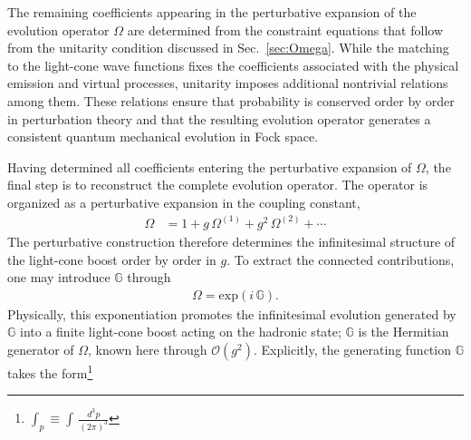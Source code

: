 \documentclass[a4paper,11pt]{article}
\def\mf#1{\mathbb{#1}}
\begin{document}
The remaining coefficients appearing in the perturbative expansion of the evolution operator $\Omega$ are determined from the constraint equations that follow from the unitarity condition discussed in Sec.~\ref{sec:Omega}. While the matching to the light-cone wave functions fixes the coefficients associated with the physical emission and virtual processes, unitarity imposes additional nontrivial relations among them. These relations ensure that probability is conserved order by order in perturbation theory and that the resulting evolution operator generates a consistent quantum mechanical evolution in Fock space.

Having determined all coefficients entering the perturbative expansion of $\Omega$, the final step is to reconstruct the complete evolution operator. The operator is organized as a perturbative expansion in the coupling constant,
\begin{align}
\Omega & = 1+ g\, \Omega^{(1)} + g^{2}\,\Omega^{(2)}+\cdots
\end{align}
The perturbative construction therefore determines the infinitesimal structure of the light-cone boost order by order in $g$. To extract the connected contributions, one may introduce $\mf{G}$ through
\begin{align}
    \Omega = \text{exp}\left(i\,\mf{G}\right).
\end{align}
Physically, this exponentiation promotes the infinitesimal evolution generated by $\mf{G}$ into a finite light-cone boost acting on the hadronic state{\color{chg}; $\mf{G}$ is the Hermitian generator of $\Omega$, known here through $\mathcal{O}(g^{2})$}. Explicitly, the generating function $\mf{G}$ takes the form\footnote{$\int_{p}\equiv \int\, \frac{d^{3}p}{(2\pi)^{3}}$}
\end{document}
